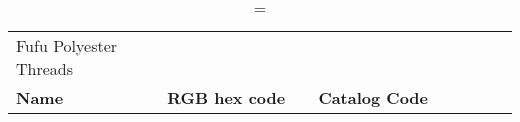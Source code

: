 
\begin{longtable}{p{0.3\linewidth} p{0.3\linewidth} p{0.4\linewidth}}
\caption = {Fufu Polyester Threads}
\label{tblr:fufupoly}\\
\textbf{Name} & \textbf{RGB hex code} & \textbf{Catalog Code} \\

\end{longtable}
